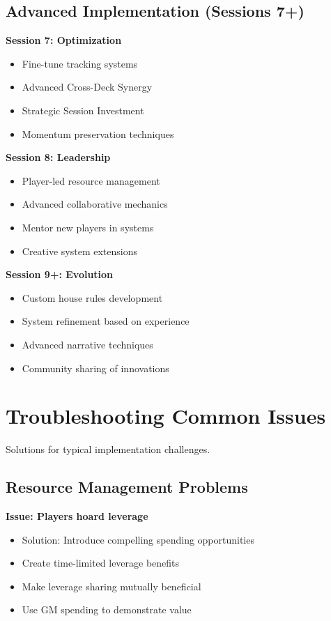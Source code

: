 \subsection{Advanced Implementation (Sessions 7+)}

\textbf{Session 7: Optimization}
\begin{itemize}
\item Fine-tune tracking systems
\item Advanced Cross-Deck Synergy
\item Strategic Session Investment
\item Momentum preservation techniques
\end{itemize}

\textbf{Session 8: Leadership}
\begin{itemize}
\item Player-led resource management
\item Advanced collaborative mechanics
\item Mentor new players in systems
\item Creative system extensions
\end{itemize}

\textbf{Session 9+: Evolution}
\begin{itemize}
\item Custom house rules development
\item System refinement based on experience
\item Advanced narrative techniques
\item Community sharing of innovations
\end{itemize}

\section{Troubleshooting Common Issues}

Solutions for typical implementation challenges.

\subsection{Resource Management Problems}

\textbf{Issue: Players hoard leverage}
\begin{itemize}
\item Solution: Introduce compelling spending opportunities
\item Create time-limited leverage benefits
\item Make leverage sharing mutually beneficial
\item Use GM spending to demonstrate value
\end{itemize}

